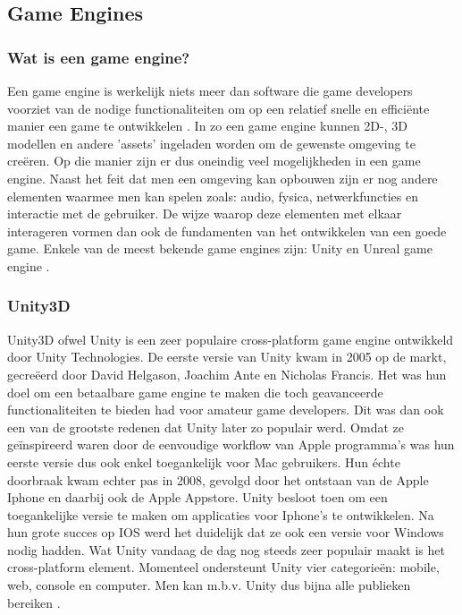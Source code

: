 \subsection{Game Engines}
\subsubsection{Wat is een game engine?}
Een game engine is werkelijk niets meer dan software die game developers voorziet van de nodige functionaliteiten om op een relatief snelle en efficiënte manier een game te ontwikkelen \autocite{Oculus2017}. In zo een game engine kunnen 2D-, 3D modellen en andere 'assets' ingeladen worden om de gewenste omgeving te creëren. Op die manier zijn er dus oneindig veel mogelijkheden in een game engine. Naast het feit dat men een omgeving kan opbouwen zijn er nog andere elementen waarmee men kan spelen zoals: audio, fysica, netwerkfuncties en interactie met de gebruiker. De wijze  waarop deze elementen met elkaar interageren vormen dan ook de fundamenten van het ontwikkelen van een goede game. Enkele van de meest bekende game engines zijn: Unity en Unreal game engine \autocite{Staff2018}.

\subsubsection{Unity3D}

Unity3D ofwel Unity is een zeer populaire cross-platform game engine ontwikkeld door Unity Technologies.
De eerste versie van Unity kwam in 2005 op de markt, gecreëerd door David Helgason, Joachim Ante en Nicholas Francis. Het was hun doel om een betaalbare game engine te maken die toch geavanceerde functionaliteiten te bieden had voor amateur game developers. Dit was dan ook een van de grootste redenen dat Unity later zo populair werd. Omdat ze geïnspireerd waren door de eenvoudige workflow van Apple programma's was hun eerste versie dus ook enkel toegankelijk voor Mac gebruikers. Hun échte doorbraak kwam echter pas in 2008, gevolgd door het ontstaan van de Apple Iphone en daarbij ook de Apple Appstore. Unity besloot toen om een toegankelijke versie te maken om applicaties voor Iphone's te ontwikkelen. Na hun grote succes op IOS werd het duidelijk dat ze ook een versie voor Windows nodig hadden. Wat Unity vandaag de dag nog steeds zeer populair maakt is het cross-platform element. Momenteel ondersteunt Unity vier categorieën: mobile, web, console en computer. Men kan m.b.v. Unity dus bijna alle publieken bereiken \autocite{Haas2014}.

